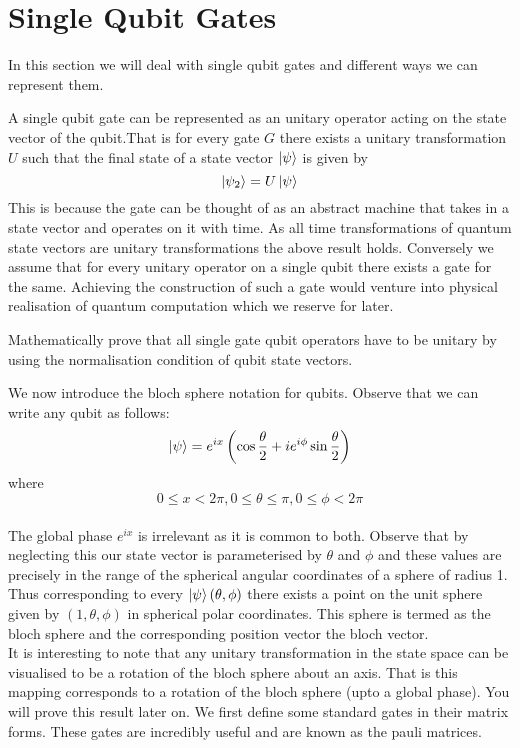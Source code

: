 \section{Single Qubit Gates}

In this section we will deal with single qubit gates and different ways we can represent them.

A single qubit gate can be represented as an unitary operator acting on the state vector of the qubit.That is for every gate $G$ there exists a unitary transformation $U$ such that the final state of a state vector $\ket{\psi}$ is given by 
$$ \ket{\psi_2} = U\ket{\psi}$$
This is because the gate can be thought of as an abstract machine that takes in a state vector and operates on it with time. As all time transformations of quantum state vectors are unitary transformations the above result holds. Conversely we assume that for every unitary operator on a single qubit there exists a gate for the same. Achieving the construction of such a gate would venture into physical realisation of quantum computation which we reserve for later.

\begin{exercise}
Mathematically prove that all single gate qubit operators have to be unitary by using the normalisation condition of qubit state vectors.
\end{exercise}

We now introduce the bloch sphere notation for qubits. Observe that we can write any qubit as follows:
$$\ket{\psi} = e^{ix}\left(\cos{\frac{\theta}{2}} + ie^{i\phi}\sin{\frac{\theta}{2}}\right)$$ where $$ 0 \leq x < 2\pi,   0 \leq \theta \leq \pi,   0\leq \phi <2\pi$$
\\
The global phase $e^{ix}$ is irrelevant as it is common to both. Observe that by neglecting this our state vector is parameterised by $\theta$ and $\phi$ and these values are precisely in the range of the spherical angular coordinates of a sphere of radius 1. Thus corresponding to every $\ket{\psi}\left(\theta, \phi \right)$ there exists a point on the unit sphere given by $(1, \theta, \phi)$ in spherical polar coordinates.
This sphere is termed as the bloch sphere and the corresponding position vector the bloch vector.\\
It is interesting to note that any unitary transformation in the state space can be visualised to be a rotation of the bloch sphere about an axis. That is this mapping corresponds to a rotation of the bloch sphere (upto a global phase). You will prove this result later on.
We first define some standard gates in their matrix forms. These gates are incredibly useful and are known as the pauli matrices.


